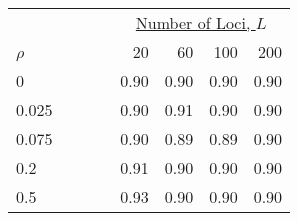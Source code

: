 \begin{tabular}{lrrrr} 
  &  \multicolumn{4}{c}{\underline{Number of Loci, $L$}} \\
$\rho$~~~~~~~~~~  &  20                 &  60                 &  100                &  200                \\  
\hline 0          &  0.90               &  0.90               &  0.90               &  0.90               \\  
0.025              &  0.90               &  0.91               &  0.90               &  0.90               \\  
0.075              &  0.90               &  0.89               &  0.89               &  0.90               \\  
0.2                &  0.91               &  0.90               &  0.90               &  0.90               \\  
0.5                &  0.93               &  0.90               &  0.90               &  0.90               \\  
\end{tabular} 
